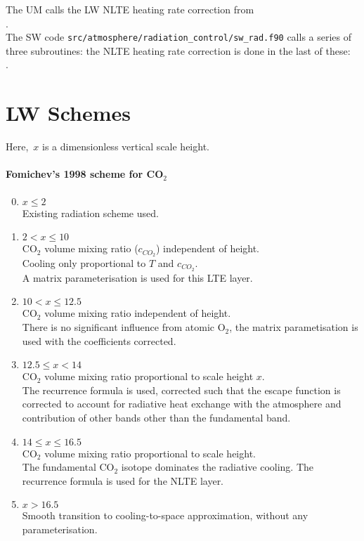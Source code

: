 The UM calls the LW NLTE heating rate correction from \\
. \\
\noindent The SW code {\tt src/atmosphere/radiation\_control/sw\_rad.f90} calls a series of three subroutines: the NLTE heating rate correction is done in the last of these:\\
.

\section{LW Schemes}

Here,~$x$ is a dimensionless vertical scale height.

\paragraph{Fomichev's 1998 scheme for CO$_2$}
\begin{enumerate}
\setcounter{enumi}{-1}
\item $x \leq 2$ \\
  Existing radiation scheme used.
\item  $2 < x \leq 10$ \\
   CO$_2$ volume mixing ratio ($c_{CO_2}$) independent of height. \\ 
   Cooling only proportional to $T$ and $c_{CO_2}$. \\
   A matrix parameterisation is used for this LTE layer.
\item  $10 < x \leq 12.5$ \\
   CO$_2$ volume mixing ratio independent of height. \\ 
   There is no significant influence from atomic O$_2$, the matrix 
   parametisation is used with the coefficients corrected.
\item  $12.5 \leq x < 14$ \\ 
   CO$_2$ volume mixing ratio proportional to scale height $x$. \\
   The recurrence formula is used, corrected such that the escape 
   function is corrected to account for radiative heat exchange with
   the atmosphere and contribution of other bands other than the 
   fundamental band.
\item  $14 \leq x \leq 16.5$ \\ 
   CO$_2$ volume mixing ratio proportional to scale height. \\
   The fundamental CO$_2$ isotope dominates the radiative cooling. The 
   recurrence formula is used for the NLTE layer.
\item  $x > 16.5$ \\ 
   Smooth transition to cooling-to-space approximation, without any 
   parameterisation.
\end{enumerate}


